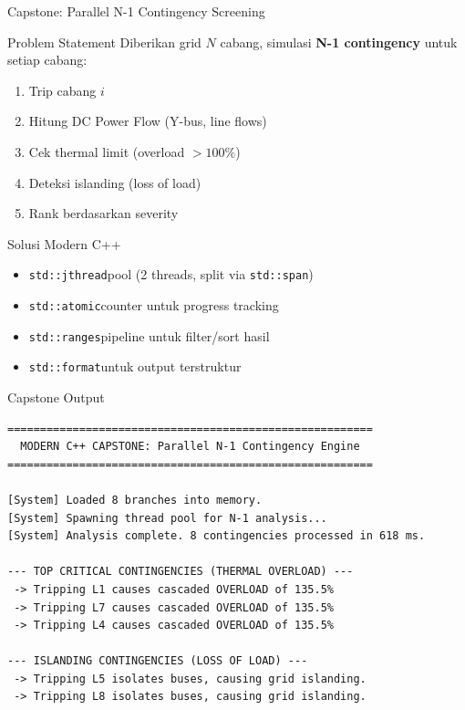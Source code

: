 \documentclass[aspectratio=169,10pt]{beamer}
\newcommand{\stdspan}{\texttt{std::span}}
\newcommand{\jthread}{\texttt{std::jthread}}
\newcommand{\atomic}{\texttt{std::atomic}}
\newcommand{\ranges}{\texttt{std::ranges}}
\newcommand{\format}{\texttt{std::format}}
\begin{document}
\begin{frame}{Capstone: Parallel N-1 Contingency Screening}
  \begin{block}{Problem Statement}
    Diberikan grid $N$ cabang, simulasi \textbf{N-1 contingency} untuk setiap cabang:
    \begin{enumerate}
      \item Trip cabang $i$
      \item Hitung DC Power Flow (Y-bus, line flows)
      \item Cek thermal limit (overload $> 100\%$)
      \item Deteksi islanding (loss of load)
      \item Rank berdasarkan severity
    \end{enumerate}
  \end{block}
  
  \begin{block}{Solusi Modern C++}
    \begin{itemize}
      \item \jthread pool (2 threads, split via \stdspan)
      \item \atomic counter untuk progress tracking
      \item \ranges pipeline untuk filter/sort hasil
      \item \format untuk output terstruktur
    \end{itemize}
  \end{block}
\end{frame}

\begin{frame}[fragile]{Capstone Output}
  \begin{verbatim}
========================================================
  MODERN C++ CAPSTONE: Parallel N-1 Contingency Engine  
========================================================

[System] Loaded 8 branches into memory.
[System] Spawning thread pool for N-1 analysis...
[System] Analysis complete. 8 contingencies processed in 618 ms.

--- TOP CRITICAL CONTINGENCIES (THERMAL OVERLOAD) ---
 -> Tripping L1 causes cascaded OVERLOAD of 135.5%
 -> Tripping L7 causes cascaded OVERLOAD of 135.5%
 -> Tripping L4 causes cascaded OVERLOAD of 135.5%

--- ISLANDING CONTINGENCIES (LOSS OF LOAD) ---
 -> Tripping L5 isolates buses, causing grid islanding.
 -> Tripping L8 isolates buses, causing grid islanding.
  \end{verbatim}
\end{frame}
\end{document}
